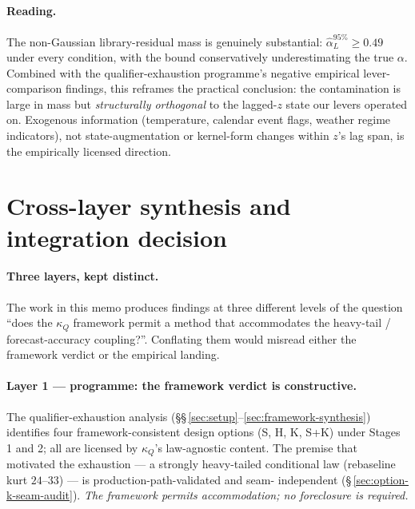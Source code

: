 \documentclass[11pt]{article}
\newcommand{\kQ}{\kappa_{Q}}
\begin{document}
\paragraph{Reading.} The non-Gaussian library-residual mass is
genuinely substantial: \(\hat\alpha_L^{95\%} \geq 0.49\) under every
condition, with the bound conservatively underestimating the true
\(\alpha\). Combined with the qualifier-exhaustion programme's
negative empirical lever-comparison findings, this reframes the
practical conclusion: the contamination is large in mass but
\emph{structurally orthogonal} to the lagged-\(z\) state our levers
operated on. Exogenous information (temperature, calendar event
flags, weather regime indicators), not state-augmentation or
kernel-form changes within \(z\)'s lag span, is the empirically
licensed direction.

\section{Cross-layer synthesis and integration decision}
\label{sec:integration}

\paragraph{Three layers, kept distinct.} The work in this memo
produces findings at three different levels of the question
``does the \(\kQ\) framework permit a method that accommodates the
heavy-tail / forecast-accuracy coupling?''. Conflating them would
misread either the framework verdict or the empirical landing.

\paragraph{Layer 1 --- programme: the framework verdict is
constructive.} The qualifier-exhaustion analysis
(\S\S\,\ref{sec:setup}--\ref{sec:framework-synthesis}) identifies
four framework-consistent design options
(\textsf{S, H, K, S+K}) under Stages 1 and 2; all are licensed by
\(\kQ\)'s law-agnostic content. The premise that motivated the
exhaustion --- a strongly heavy-tailed conditional law (rebaseline
kurt \(24\)--\(33\)) --- is production-path-validated and seam-
independent (\S\,\ref{sec:option-k-seam-audit}). \emph{The framework
permits accommodation; no foreclosure is required.}
\end{document}

